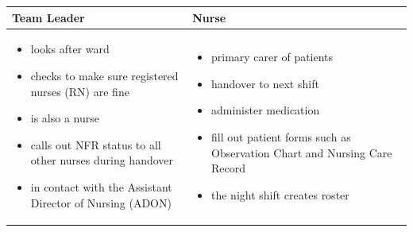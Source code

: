 \hfil\begin{tabular}{|p{7cm}|p{7cm}|}
\hline
{\hfil\bf Team Leader} & {\hfil\bf Nurse} \\
\hline
\begin{itemize}
\item looks after ward
\item checks to make sure registered nurses (RN) are fine
\item is also a nurse
\item calls out \gls{NFR} status to all other nurses during handover
\item in contact with the Assistant Director of Nursing (ADON)
\end{itemize} & 
\begin{itemize}
\item primary carer of patients
\item handover to next shift
\item administer medication
\item fill out patient forms such as Observation Chart and Nursing Care Record
\item the night shift creates roster
\end{itemize} \\ 
\hline
\end{tabular}

